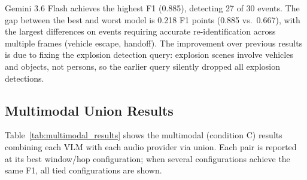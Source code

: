Gemini 3.6 Flash achieves the highest F1 (0.885), detecting 27 of 30 events. The gap between the best and worst model is 0.218 F1 points (0.885 vs.\ 0.667), with the largest differences on events requiring accurate re-identification across multiple frames (vehicle escape, handoff). The improvement over previous results is due to fixing the explosion detection query: explosion scenes involve vehicles and objects, not persons, so the earlier query silently dropped all explosion detections.

\subsection{Multimodal Union Results}

Table~\ref{tab:multimodal_results} shows the multimodal (condition C) results combining each VLM with each audio provider via union. Each pair is reported at its best window/hop configuration; when several configurations achieve the same F1, all tied configurations are shown.

\begin{table}[h]
  \centering
  \caption{Multimodal (condition C) across all VLM and audio combinations.}
  \label{tab:multimodal_results}
\end{table}

